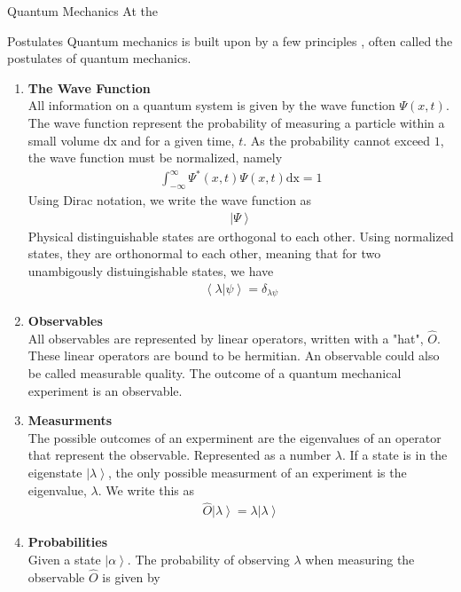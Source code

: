 \documentclass[twoside,english]{uiofysmaster}
\begin{document}
\begin{chapter}{Quantum Mechanics}
 	At the 
	\begin{section}{Postulates}
 		Quantum mechanics is built upon by a few principles \cite{Audun,Griffiths,Sakurai,Susskind2014}, often called the postulates of quantum mechanics. 
 		\begin{enumerate}
 			\item \textbf{The Wave Function} \\
 			All information on a quantum system is given by the wave function $\Psi(x,t) $. The wave function represent the probability of measuring a particle within a small volume $\text{dx}$ and for a given time, $t$. As the probability cannot exceed $1$, the wave function must be normalized, namely
 			\begin{align}
 				\int_{-\infty}^\infty \Psi^*(x,t) \Psi(x,t) \text{dx} = 1
 			\end{align}
 			Using Dirac notation, we write the wave function as
 			\begin{align}
 				\left| \Psi \right>
 			\end{align}
 			Physical distinguishable states are orthogonal to each other. Using normalized states, they are orthonormal to each other, meaning that for two unambigously distuingishable states, we have
 			\begin{align}
 				\left< \lambda | \psi \right> = \delta_{\lambda \psi}
 			\end{align}
 			\item \textbf{Observables}\\
			All observables are represented by linear operators, written with a "hat", $\hat O$. These linear operators are bound to be hermitian. An observable could also be called measurable quality. The outcome of a quantum mechanical experiment is an observable. 
			\item \textbf{Measurments}\\
			The possible outcomes of an experminent are the eigenvalues of an operator that represent the observable. Represented as a number $\lambda$. If a state is in the eigenstate $\left| \lambda \right>$, the only possible measurment of an experiment is the eigenvalue, $\lambda$. We write this as
 			\begin{align}
 				\hat O \left| \lambda \right> = \lambda \left| \lambda \right>
 			\end{align}
 			\item \textbf{Probabilities}\\
 			Given a state $\left| \alpha \right>$. The probability of observing $\lambda$ when measuring the observable $\hat O$ is given by 

\end{enumerate}
\end{section}
\end{chapter}
\end{document}

